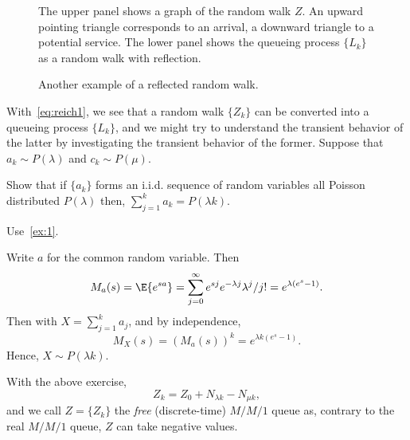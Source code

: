 \begin{figure}[ht]
 \centering

%
\caption{The upper panel shows a graph of the random walk $Z$. An
 upward pointing triangle corresponds to an arrival, a downward
 triangle to a potential service. The lower panel shows the queueing
 process $\{L_k\}$ as a random walk with reflection.}
\label{fig:random_bernoulli}
\end{figure}

\begin{figure}[ht]
 \centering

\caption{Another example of a reflected random walk.}
\label{fig:random_walk}
\end{figure}


With~\cref{eq:reich1}, we see that a random walk $\{Z_k\}$ can be converted into a queueing process $\{L_k\}$, and we might try to understand the transient behavior of the latter by investigating the transient behavior of the former.
Suppose that $a_k\sim P(\lambda)$ and $c_k \sim P(\mu)$.

\begin{exercise}
  Show that if $\{a_k\}$ forms an i.i.d.
sequence of random variables all Poisson distributed $P(\lambda)$ then, $\sum_{j=1}^k a_k = P(\lambda k)$. 
\begin{hint}
Use~\cref{ex:1}.
\end{hint}
\begin{solution} Write $a$ for the common random variable. Then
  \begin{equation*}
    M_a(s) = \E{e^{sa}} = \sum_{j=0}^\infty e^{s j} e^{-\lambda j} \lambda^j/j! = e^{\lambda(e^{s}-1)}. 
  \end{equation*}
  Then with $X=\sum_{j=1}^k a_j$, and by independence, 
  \begin{equation*}
    M_X(s) = \left(M_a(s)\right)^k = e^{\lambda k (e^{s}-1)}. 
  \end{equation*}
  Hence, $X\sim P(\lambda k)$. 
\end{solution}
\end{exercise}


With the above exercise, 
\begin{equation*}
 Z_k = Z_0+N_{\lambda k} - N_{\mu k},
\end{equation*}
and we call $Z=\{Z_k\}$ the \emph{free} (discrete-time) $M/M/1$ queue as, contrary to the real $M/M/1$ queue, $Z$ can take negative values.

